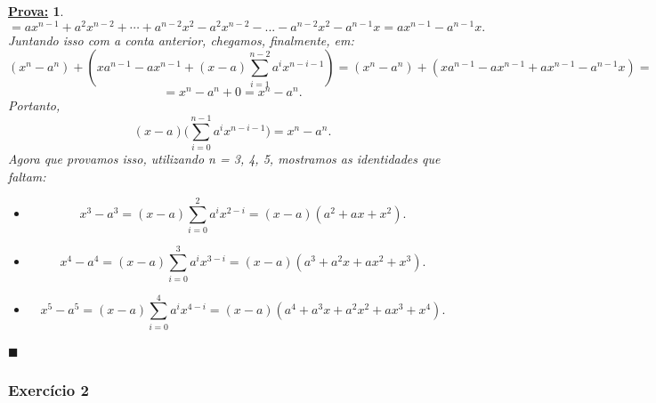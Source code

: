 \documentclass{article}
\newtheorem*{proof*}{\underline{Prova:}}
\renewcommand\qedsymbol{$\blacksquare$}
\begin{document}
\begin{proof*}
	$$
	= ax^{n-1} + a^2x^{n-2} + \cdots + a^{n-2}x^2 - a^2x^{n-2} - ... -a^{n-2}x^2 - a^{n-1}x = ax^{n-1} - a^{n-1}x.
	$$
Juntando isso com a conta anterior, chegamos, finalmente, em:
	$$
	(x^n - a^n) + (xa^{n-1} - ax^{n-1} + (x-a)\sum_{i=1}^{n-2}a^ix^{n-i-1}) = (x^n - a^n) + (xa^{n-1} - ax^{n-1} + ax^{n-1} - a^{n-1}x ) =
	$$
	$$
	= x^n - a^n + 0 = x^n - a^n.
	$$
Portanto, 
	$$
	(x - a)\biggl(\sum_{i=0}^{n-1}a^ix^{n-i-1}\biggr) = x^n - a^n.
	$$
Agora que provamos isso, utilizando n = 3, 4, 5, mostramos as identidades que faltam:
\begin{itemize}
\item[n=3:] $$ x^3 - a^3 = (x-a)\sum_{i=0}^{2}a^ix^{2-i} = (x-a)(a^2 + ax + x^2). $$
\item[n=4:] $$ x^4 - a^4 = (x-a)\sum_{i=0}^{3}a^ix^{3-i} = (x-a)(a^3 + a^2x + ax^2 + x^3). $$
\item[n=5:] $$ x^5 - a^5 = (x-a)\sum_{i=0}^{4}a^ix^{4-i} = (x-a)(a^4 + a^3x + a^2x^2 + ax^3 + x^4).$$
\end{itemize}
\qedsymbol	
\end{proof*}

\subsubsection{Exerc\'icio 2} 
\end{document}
